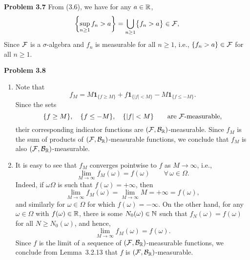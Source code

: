 \bigskip

\textbf{Problem 3.7} 
From (3.6), we have for any $a\in\mathbb R$,
\[
	\left\{ \sup_{n\ge 1} f_n>a\right\} = \bigcup_{n\ge 1} \bigl\{ f_n>a\bigr\}\in\mathcal F,
\]
Since $\mathcal F$ is a $\sigma$-algebra and $f_n$ is measurable for all $n\ge 1$, i.e., $\{f_n>a\}\in\mathcal F$ for all $n\ge 1$.


\bigskip

\textbf{Problem 3.8}

\begin{enumerate}[label=(\alph*)]
	\item Note that
	\[
		f_M = M\mathbf{1}_{\{f\ge M\}} + f\mathbf{1}_{\{|f|< M\}} - M\mathbf{1}_{\{f\le -M\}}.
	\]
	Since the sets
	\[
		\{f\ge M\},\quad \{f\le -M\},\quad \{|f|<M\}\qquad\text{are $\mathcal F$-measurable},
	\]
	their corresponding indicator functions are $(\mathcal F,\mathcal B_{\mathbb R})$-measurable. Since $f_M$ is the sum of products of $(\mathcal F,\mathcal B_{\mathbb R})$-measurable functions, we conclude that $f_M$ is also $(\mathcal F,\mathcal B_{\mathbb R})$-measurable.
	
	\item It is easy to see that $f_M$ converges pointwise to $f$ as $M\to\infty$, i.e.,
	\[
		\lim_{M\to\infty} f_M(\omega) = f(\omega)\qquad\forall\, \omega\in\Omega.
	\]
	Indeed, if $\omega\Omega$ is such that $f(\omega)=+\infty$, then
	\[
		\lim_{M\to\infty} f_M(\omega) = \lim_{M\to\infty} M = +\infty = f(\omega),
	\]
	and similarly for $\omega\in\Omega$ for which $f(\omega)=-\infty$. On the other hand, for any $\omega\in\Omega$ with $f(\omega)\in\mathbb R$, there is some $N_0(\omega)\in\mathbb N$ such that $f_N(\omega)=f(\omega)$ for all $N\ge N_0(\omega)$, and hence,
	\[
		\lim_{M\to\infty} f_M(\omega) = f(\omega).
	\]
	Since $f$ is the limit of a sequence of $(\mathcal F,\mathcal B_{\mathbb R})$-measurable functions, we conclude from Lemma~3.2.13 that $f$ is $(\mathcal F,\mathcal B_{\mathbb R})$-measurable.
\end{enumerate}




